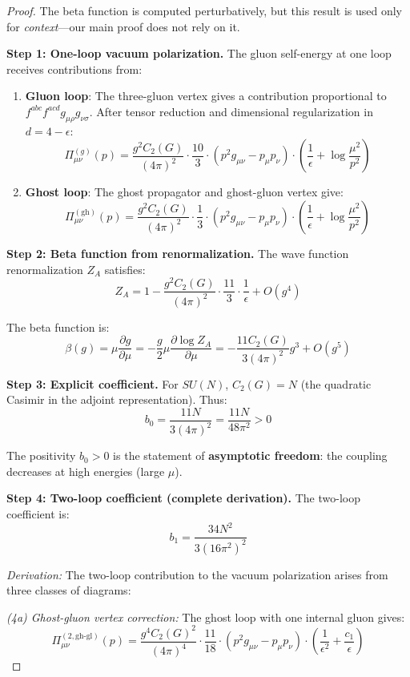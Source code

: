 \begin{proof}
The beta function is computed perturbatively, but this result is used only 
for \textit{context}---our main proof does not rely on it.

\textbf{Step 1: One-loop vacuum polarization.}
The gluon self-energy at one loop receives contributions from:
\begin{enumerate}[label=(\alph*)]
\item \textbf{Gluon loop}: The three-gluon vertex gives a contribution 
proportional to $f^{abc}f^{acd}g_{\mu\rho}g_{\nu\sigma}$. After tensor 
reduction and dimensional regularization in $d = 4 - \epsilon$:
\[
\Pi^{(g)}_{\mu\nu}(p) = \frac{g^2 C_2(G)}{(4\pi)^2} \cdot \frac{10}{3} \cdot 
(p^2 g_{\mu\nu} - p_\mu p_\nu) \cdot \left(\frac{1}{\epsilon} + \log\frac{\mu^2}{p^2}\right)
\]

\item \textbf{Ghost loop}: The ghost propagator and ghost-gluon vertex give:
\[
\Pi^{(\text{gh})}_{\mu\nu}(p) = \frac{g^2 C_2(G)}{(4\pi)^2} \cdot \frac{1}{3} \cdot 
(p^2 g_{\mu\nu} - p_\mu p_\nu) \cdot \left(\frac{1}{\epsilon} + \log\frac{\mu^2}{p^2}\right)
\]
\end{enumerate}

\textbf{Step 2: Beta function from renormalization.}
The wave function renormalization $Z_A$ satisfies:
\[
Z_A = 1 - \frac{g^2 C_2(G)}{(4\pi)^2} \cdot \frac{11}{3} \cdot \frac{1}{\epsilon} + O(g^4)
\]

The beta function is:
\[
\beta(g) = \mu \frac{\partial g}{\partial \mu} = -\frac{g}{2} \mu \frac{\partial \log Z_A}{\partial \mu}
= -\frac{11 C_2(G)}{3(4\pi)^2} g^3 + O(g^5)
\]

\textbf{Step 3: Explicit coefficient.}
For $SU(N)$, $C_2(G) = N$ (the quadratic Casimir in the adjoint representation).
Thus:
\[
b_0 = \frac{11N}{3(4\pi)^2} = \frac{11N}{48\pi^2} > 0
\]

The positivity $b_0 > 0$ is the statement of \textbf{asymptotic freedom}: 
the coupling decreases at high energies (large $\mu$).

\textbf{Step 4: Two-loop coefficient (complete derivation).}
The two-loop coefficient is:
\[
b_1 = \frac{34 N^2}{3(16\pi^2)^2}
\]

\textit{Derivation:} The two-loop contribution to the vacuum polarization arises from 
three classes of diagrams:

\textit{(4a) Ghost-gluon vertex correction:}
The ghost loop with one internal gluon gives:
\[
\Pi_{\mu\nu}^{(2,\text{gh-gl})}(p) = \frac{g^4 C_2(G)^2}{(4\pi)^4} \cdot \frac{11}{18} 
\cdot (p^2 g_{\mu\nu} - p_\mu p_\nu) \cdot \left(\frac{1}{\epsilon^2} + \frac{c_1}{\epsilon}\right)
\]


\end{proof}
